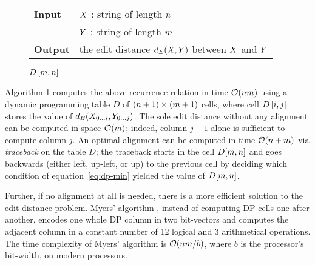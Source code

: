 \begin{figure*}[t]
\begin{center}
\begin{minipage}[t]{.9\textwidth}
\begin{algorithm}[H]
\begin{tabular}{ll}
\textbf{Input}  & $X$ : string of length $n$\\
				& $Y$ : string of length $m$\\
\textbf{Output} & the edit distance $d_E(X,Y)$ between $X$ and $Y$\\
\end{tabular}
\begin{algorithmic}[1]
\EndFor
{}
	\EndFor
\EndFor
\State \Return $D\left[m,n\right]$
\end{algorithmic}
\label{alg:dp-edit}
\end{algorithm}
\end{minipage}
\end{center}
\end{figure*}

Algorithm \ref{alg:dp-edit} computes the above recurrence relation in time $\mathcal{O}(nm)$ using a dynamic programming table $D$ of $(n+1) \times (m+1)$ cells, where cell $D\left[i,j\right]$ stores the value of $d_E({X}_{{0}\dots{i}},{Y}_{{0}\dots{j}})$.
The sole edit distance without any alignment can be computed in space $\mathcal{O}(m)$; indeed, column $j-1$ alone is sufficient to compute column $j$.
An optimal alignment can be computed in time $\mathcal{O}(n + m)$ via \emph{traceback} on the table $D$;
the traceback starts in the cell $D[m,n]$ and goes backwards (either left, up-left, or up) to the previous cell by deciding which condition of equation~\ref{eq:dp-min} yielded the value of $D[m,n]$.

Further, if no alignment at all is needed, there is a more efficient solution to the edit distance problem.
Myers' algorithm \citep{Myers1999}, instead of computing DP cells one after another, encodes one whole DP column in two bit-vectors and computes the adjacent column in a constant number of 12 logical and 3 arithmetical operations.
The time complexity of Myers' algorithm is $\mathcal{O}(nm/b)$, where $b$ is the processor's bit-width,  on modern processors.

